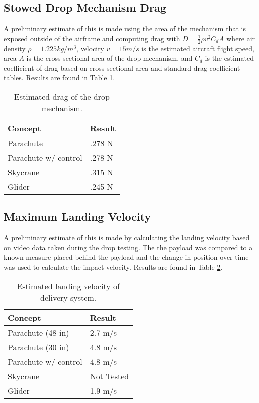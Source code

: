 \documentclass[]{auvsi_doc}
\begin{document}
	\subsection{Stowed Drop Mechanism Drag}                                   


	A preliminary estimate of this is made using the area of the mechanism that is exposed outside of the airframe and computing drag with $D = \frac{1}{2}\rho v^2 C_d A$ where air density $\rho = 1.225 kg/m^3$, velocity $v = 15 m/s$ is the estimated aircraft flight speed, area $A$ is the cross sectional area of the drop mechanism, and $C_d$ is the estimated coefficient of drag based on cross sectional area and standard drag coefficient tables. Results are found in Table \ref{drag}.
	

	\begin{table}[!h]
	\centering

	\caption{Estimated drag of the drop mechanism.}
\label{drag}
	\begin{tabular}{|l|l|}
		\hline
		\textbf{Concept}       & \textbf{Result} \\
		\hline
		Parachute              &        .278 N        \\
		Parachute w/ control   &    	.278 N            \\
		Skycrane               &        .315 N         \\
		Glider                 &		.245 N		 \\
		\hline
	\end{tabular}
	\end{table}
	\subsection{Maximum Landing Velocity}

	
	A preliminary estimate of this is made by calculating the landing velocity based on video data taken during the drop testing. The the payload was compared to a known measure placed behind the payload and the change in position over time was used to calculate the impact velocity. Results are found in Table \ref{vel}.


	\begin{table}[!h]
	\centering

	\caption{Estimated landing velocity of delivery system.}
	\label{vel}
	\begin{tabular}{|l|l|}
		\hline
		\textbf{Concept}       & \textbf{Result} \\
		\hline
		Parachute (48 in)              &        2.7 m/s         \\
		Parachute (30 in)		&	4.8 m/s\\
		Parachute w/ control   &                4.8 m/s \\
		Skycrane               &                 Not Tested\\
		Glider                 &			1.9 m/s	 \\
		\hline
	\end{tabular}
	\end{table}
\end{document}
